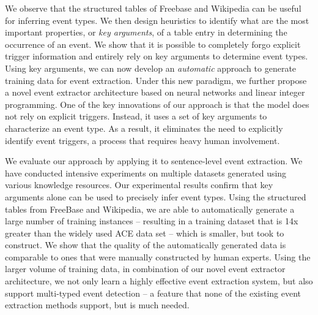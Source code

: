 We observe that the structured tables of Freebase and Wikipedia can be useful for inferring event types. We then design heuristics to
identify what are the most important properties, or \emph{key arguments},  of a table entry in determining the occurrence of an event. We
show that it is possible to completely forgo explicit trigger information and entirely rely on key arguments to determine event types.
Using key arguments, we can now develop an \emph{automatic} approach to generate training data for event extraction. Under this new \DS
paradigm, we further propose a novel event extractor architecture based on neural networks and linear integer programming. One of the key
innovations of our approach is that the model does not rely on explicit triggers. Instead, it uses a set of key arguments to characterize
an event type. As a result, it eliminates the need to explicitly identify event triggers, a process that requires heavy human involvement.

We evaluate our approach by applying it to sentence-level event extraction. We have conducted intensive experiments on multiple datasets
generated using various knowledge resources. Our experimental results confirm that key arguments alone can be used to precisely infer event
types. Using the structured tables from FreeBase and Wikipedia, we are able to automatically generate a large number of training instances
-- resulting in a training dataset that is 14x greater than the widely used ACE data set  -- which is smaller, but took  to construct.  We show that the quality of the automatically generated data is comparable to ones that were manually
constructed by human experts. Using the larger volume of training data, in combination of our novel event extractor architecture, we not
only learn a highly effective event extraction system, but also support multi-typed event detection -- a feature that none of the existing
event extraction methods support, but is much needed.






